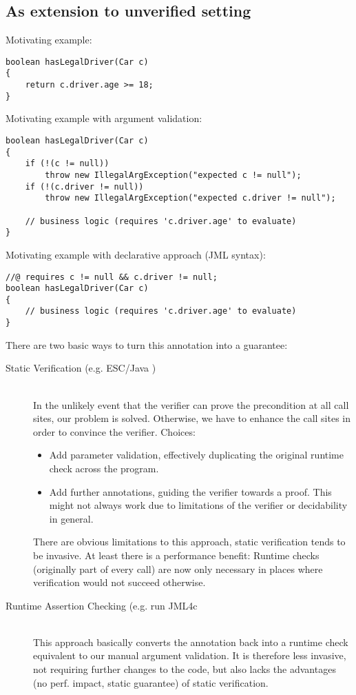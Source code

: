 
\subsection{As extension to unverified setting}
Motivating example:
\begin{lstlisting}
boolean hasLegalDriver(Car c)
{
    return c.driver.age >= 18;
}
\end{lstlisting}

Motivating example with argument validation:
\begin{lstlisting}
boolean hasLegalDriver(Car c)
{
    if (!(c != null))
        throw new IllegalArgException("expected c != null");
    if (!(c.driver != null))
        throw new IllegalArgException("expected c.driver != null");
        
    // business logic (requires 'c.driver.age' to evaluate)
}
\end{lstlisting}

Motivating example with declarative approach (JML syntax):
\begin{lstlisting}
//@ requires c != null && c.driver != null;
boolean hasLegalDriver(Car c)
{
    // business logic (requires 'c.driver.age' to evaluate)
}
\end{lstlisting}

There are two basic ways to turn this annotation into a guarantee:
\begin{description}
    \item[Static Verification (e.g. ESC/Java \cite{leino2000esc})]~\\
    In the unlikely event that the verifier can prove the precondition at all call sites, our problem is solved.
    Otherwise, we have to enhance the call sites in order to convince the verifier.
    Choices:
    \begin{itemize}
        \item 
        Add parameter validation, effectively duplicating the original runtime check across the program.
        \item
        Add further annotations, guiding the verifier towards a proof.
        This might not always work due to limitations of the verifier or decidability in general.
    \end{itemize}
    There are obvious limitations to this approach, static verification tends to be invasive.
    At least there is a performance benefit: 
    Runtime checks (originally part of every call) are now only necessary in places where verification would not succeed otherwise.
    
    \item[Runtime Assertion Checking (e.g. run JML4c \cite{sarcar2010new}]~\\
    This approach basically converts the annotation back into a runtime check equivalent to our manual argument validation.
    It is therefore less invasive, not requiring further changes to the code, but also lacks the advantages (no perf. impact, static guarantee) of static verification.
\end{description}

